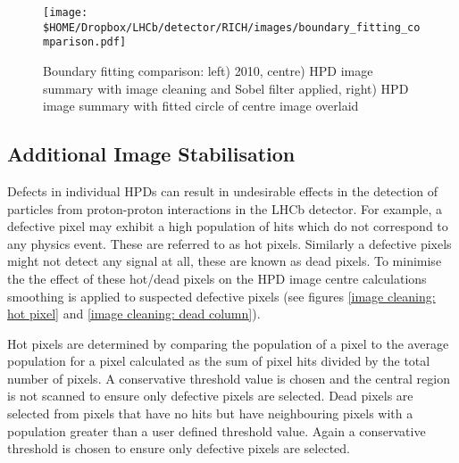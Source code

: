 \begin{figure}
	\begin{center}
		\texttt{[image: \$HOME/Dropbox/LHCb/detector/RICH/images/boundary\_fitting\_comparison.pdf]}
		\caption{Boundary fitting comparison: left) 2010, centre) HPD image summary with image cleaning and Sobel filter applied, right) HPD image summary with fitted circle of centre image overlaid}
		\label{fig: comparison of 2010, 2011 boundary fitting}
	\end{center}
\end{figure}




\subsection{Additional Image Stabilisation} 

Defects in individual HPDs can result in undesirable effects in the detection of particles from proton-proton interactions in the LHCb detector. For example, a defective pixel may exhibit a high population of hits which do not correspond to any physics event. These are referred to as hot pixels. Similarly a defective pixels might not detect any signal at all, these are known as dead pixels. To minimise the the effect of these hot/dead pixels on the HPD image centre calculations smoothing is applied to suspected defective pixels (see figures \ref{image cleaning: hot pixel} and \ref{image cleaning: dead column}). 

Hot pixels are determined by comparing the population of a pixel to the average population for a pixel calculated as the sum of pixel hits divided by the total number of pixels. A conservative threshold value is chosen and the central region is not scanned to ensure only defective pixels are selected. Dead pixels are selected from pixels that have no hits but have neighbouring pixels with a population greater than a user defined threshold value. Again a conservative threshold is chosen to ensure only defective pixels are selected.

